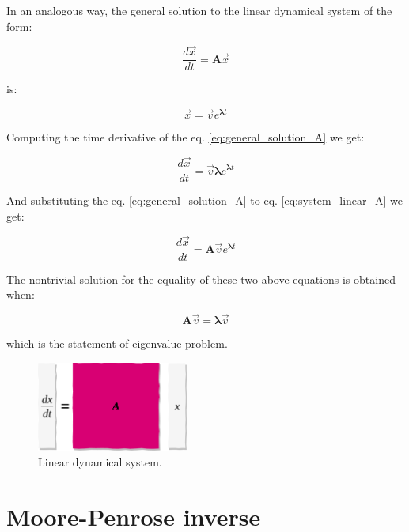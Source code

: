 \documentclass[10pt,twocolumn]{article}
\begin{document}
In an analogous way, the general solution to the linear dynamical system of the form:

\begin{equation} \label{eq:system_linear_A}
\frac{d \vec{x}}{dt} = \bm{A} \vec{x}
\end{equation}

is:

\begin{equation} \label{eq:general_solution_A}
\vec{x} = \vec{v} e^{\bm{\lambda} t}
\end{equation}

Computing the time derivative of the eq. \ref{eq:general_solution_A} we get:

\begin{equation} \label{eq:sub1}
\frac{d \vec{x}}{dt} = \vec{v} \bm{\lambda} e^{\bm{\lambda} t}
\end{equation}

And substituting the eq. \ref{eq:general_solution_A} to eq. \ref{eq:system_linear_A} we get:

\begin{equation} \label{eq:sub2}
\frac{d \vec{x}}{dt} = \bm{A} \vec{v} e^{\bm{\lambda} t}
\end{equation}

The nontrivial solution for the equality of these two above equations is obtained when:

\begin{equation} \label{eq:eigval}
\bm{A} \vec{v} = \bm{\lambda} \vec{v} 
\end{equation}

which is the statement of eigenvalue problem.



\begin{figure}[H]
\centering\includegraphics[width=5cm]{lin-dyn.png}
\caption{Linear dynamical system.}
\label{fig:linear_system}
\end{figure}










\section{Moore-Penrose inverse} \label{app:B}
\end{document}
